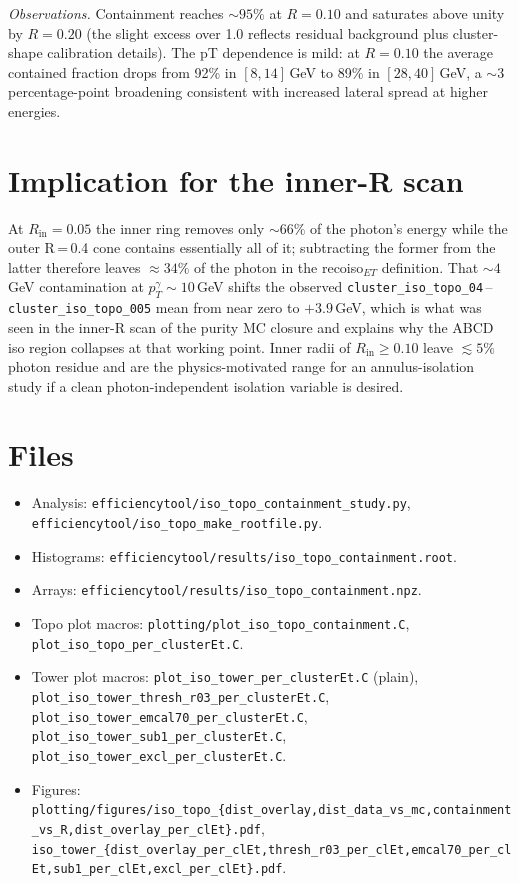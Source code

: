 \documentclass[11pt]{article}
\begin{document}
\emph{Observations.} Containment reaches $\sim\!95\%$ at $R=0.10$ and saturates above unity
by $R=0.20$ (the slight excess over 1.0 reflects residual background plus cluster-shape
calibration details). The pT dependence is mild: at $R=0.10$ the average contained fraction
drops from 92\% in $[8,14]$\,GeV to 89\% in $[28,40]$\,GeV, a $\sim\!3$ percentage-point
broadening consistent with increased lateral spread at higher energies.

\section{Implication for the inner-R scan}

At $R_\text{in} = 0.05$ the inner ring removes only $\sim\!66\%$ of the photon's energy
while the outer R\,=\,0.4 cone contains essentially all of it; subtracting the former from
the latter therefore leaves $\approx\!34\%$ of the photon in the recoiso$_{ET}$
definition. That $\sim\!4$\,GeV contamination at $p_T^{\gamma}\!\sim\!10$\,GeV shifts
the observed \texttt{cluster\_iso\_topo\_04}\,--\,\texttt{cluster\_iso\_topo\_005} mean from
near zero to $+3.9$\,GeV, which is what was seen in the inner-R scan of the purity MC
closure and explains why the ABCD iso region collapses at that working point. Inner radii
of $R_\text{in} \geq 0.10$ leave $\lesssim 5\%$ photon residue and are the physics-motivated
range for an annulus-isolation study if a clean photon-independent isolation variable is
desired.

\section{Files}

\begin{itemize}
  \item Analysis: \texttt{efficiencytool/iso\_topo\_containment\_study.py},
        \texttt{efficiencytool/iso\_topo\_make\_rootfile.py}.
  \item Histograms: \texttt{efficiencytool/results/iso\_topo\_containment.root}.
  \item Arrays: \texttt{efficiencytool/results/iso\_topo\_containment.npz}.
  \item Topo plot macros:
        \texttt{plotting/plot\_iso\_topo\_containment.C},
        \texttt{plot\_iso\_topo\_per\_clusterEt.C}.
  \item Tower plot macros:
        \texttt{plot\_iso\_tower\_per\_clusterEt.C} (plain),
        \texttt{plot\_iso\_tower\_thresh\_r03\_per\_clusterEt.C},
        \texttt{plot\_iso\_tower\_emcal70\_per\_clusterEt.C},
        \texttt{plot\_iso\_tower\_sub1\_per\_clusterEt.C},
        \texttt{plot\_iso\_tower\_excl\_per\_clusterEt.C}.
  \item Figures: \texttt{plotting/figures/iso\_topo\_\{dist\_overlay,dist\_data\_vs\_mc,containment\_vs\_R,dist\_overlay\_per\_clEt\}.pdf},
        \texttt{iso\_tower\_\{dist\_overlay\_per\_clEt,thresh\_r03\_per\_clEt,emcal70\_per\_clEt,sub1\_per\_clEt,excl\_per\_clEt\}.pdf}.
\end{itemize}
\end{document}
